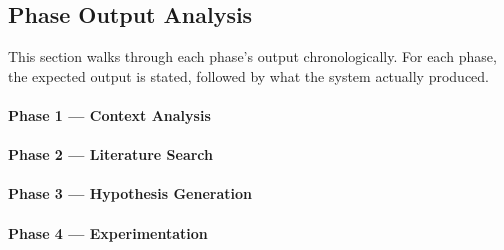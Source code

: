 
\subsection{Phase Output Analysis}

This section walks through each phase's output chronologically.
For each phase, the expected output is stated, followed by what the system actually produced.

\paragraph{Phase 1 --- Context Analysis}

\paragraph{Phase 2 --- Literature Search}

\paragraph{Phase 3 --- Hypothesis Generation}

\paragraph{Phase 4 --- Experimentation}


